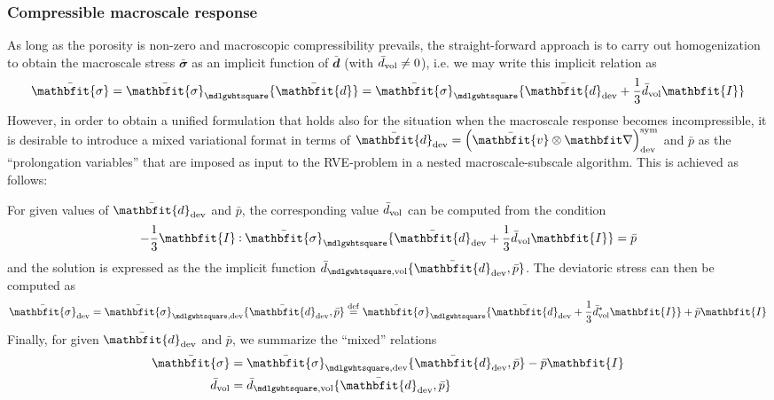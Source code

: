 \documentclass[10pt,a4paper]{article}
\renewcommand{\ta}[1]{\mathbfit{#1}}
\renewcommand{\ts}[1]{\mathbfit{#1}}
\renewcommand{\Box}{\mdlgwhtsquare}
\begin{document}
\subsubsection{Compressible macroscale response}

As long as the porosity is non-zero and macroscopic compressibility prevails, the straight-forward approach is to carry out homogenization to obtain the macroscale stress $\bar{\ts\sigma}$ as an implicit function of $\bar{\ts d}$ (with $\bar{d}_{\mathrm{vol}}\neq 0$), i.e. we may write this implicit relation as
\begin{equation}
   \bar{\ts\sigma} = \bar{\ts\sigma}_\Box\{\bar{\ts d}\} = \bar{\ts\sigma}_\Box\{\bar{\ts d}_\dev +\frac13\bar{d}_\vol\ts I\}
\label{eq416a}
\end{equation}
However, in order to obtain a unified formulation that holds also for the situation when the macroscale response becomes incompressible, it is desirable to introduce a mixed variational format in terms of $\bar{\ts d}_\dev=\left(\bar{\ta v}\outerp\diff\right)^\sym_\dev$ and $\bar{p}$ as the ``prolongation variables'' that are imposed as input to the RVE-problem in a nested macroscale-subscale algorithm. This is achieved as follows:

For given values of $\bar{\ts d}_\dev$ and $\bar{p}$, the corresponding value $\bar{d}_{\mathrm{vol}}$ can be computed from the condition
\begin{equation}
    -\frac13 \ts I\dprod \bar{\ts\sigma}_\Box\{\bar{\ts d}_\dev +\frac13\bar{d}_\vol\ts I\} = \bar p
\label{eq416}
\end{equation}
and the solution is expressed as the the implicit function $\bar{d}_{\Box,\vol}\{\bar{\ts d}_\dev,\bar{p}\}$. The deviatoric stress can then be computed as
\begin{equation}
    \bar{\ts\sigma}_{\dev} = \bar{\ts\sigma}_{\Box,\dev}\{\bar{\ts d}_\dev,\bar p\} \defeq \bar{\ts\sigma}_\Box\{\bar{\ts d}_\dev + \frac13 \bar{d}_\vol^*\ts I\} + \bar{p}\ts{I}
\label{eq418}
\end{equation}
Finally, for given $\bar{\ts d}_\dev$ and $\bar{p}$, we summarize the ``mixed'' relations
\begin{align}
 \bar{\ts\sigma} & =  \bar{\ts\sigma}_{\Box,\dev}\{\bar{\ts d}_\dev,\bar p\} - \bar p\ts I
\label{eq418a}\\
 \bar{d}_\vol & =  \bar{d}_{\Box,\vol}\{\bar{\ts d}_\dev, \bar p\}
\label{eq418b}
\end{align}
\end{document}
